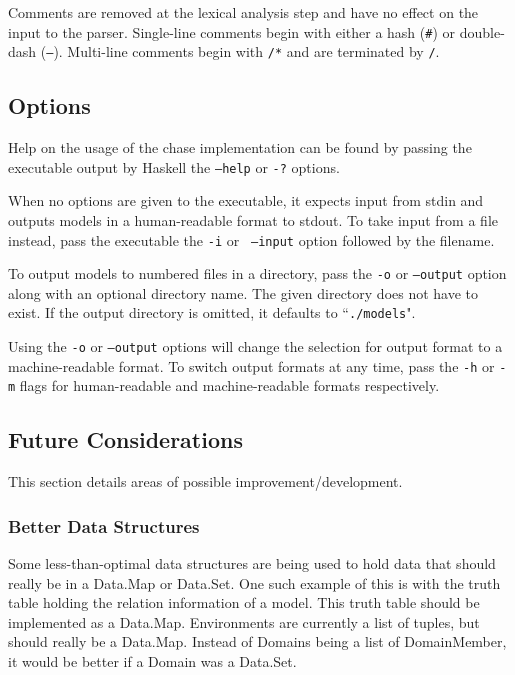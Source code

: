		Comments are removed at the lexical analysis step and have no effect on
		the input to the parser. Single-line comments begin with either a hash
		({\tt \#}) or double-dash ({\tt --}). Multi-line comments begin with
		{\tt /*} and are terminated by {\tt */}.

	\subsection{Options}

		Help on the usage of the chase implementation can be found by passing
		the executable output by Haskell the {\tt --help} or {\tt -?} options.

		When no options are given to the executable, it expects input from
		stdin and outputs models in a human-readable format to stdout. To take
		input from a file instead, pass the executable the {\tt -i} or {\tt
		--input} option followed by the filename.

		To output models to numbered files in a directory, pass the {\tt -o} or
		{\tt --output} option along with an optional directory name. The given
		directory does not have to exist. If the output directory is omitted,
		it defaults to ``{\tt ./models}".

		Using the {\tt -o} or {\tt --output} options will change the selection
		for output format to a machine-readable format. To switch output formats
		at any time, pass the {\tt -h} or {\tt -m} flags for human-readable and
		machine-readable formats respectively.


	\subsection{Future Considerations}

		This section details areas of possible improvement/development.

		\subsubsection{Better Data Structures}

			Some less-than-optimal data structures are being used to hold data
			that should really be in a Data.Map or Data.Set. One such example
			of this is with the truth table holding the relation information of
			a model. This truth table should be implemented as a Data.Map.
			Environments are currently a list of tuples, but should really be a
			Data.Map. Instead of Domains being a list of DomainMember, it
			would be better if a Domain was a Data.Set.

